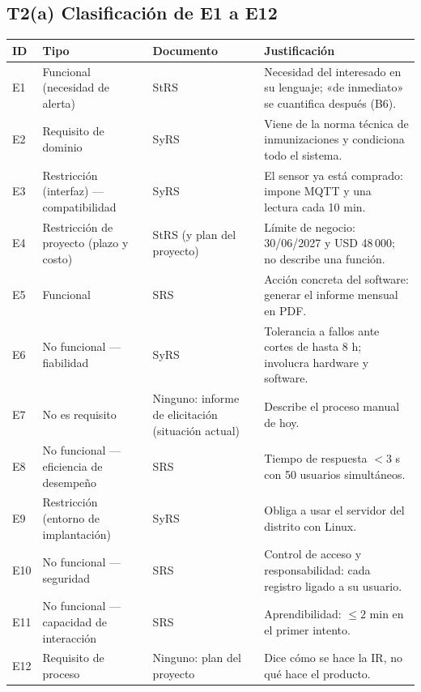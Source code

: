 \documentclass[11pt,a4paper]{article}
\begin{document}
\subsection*{T2(a) Clasificación de E1 a E12}

\begingroup
\small
\setlength{\tabcolsep}{4pt}
\renewcommand{\arraystretch}{1.2}
\begin{longtable}{@{}p{.07\linewidth}p{.27\linewidth}p{.20\linewidth}p{.39\linewidth}@{}}
\hline
\textbf{ID} & \textbf{Tipo} & \textbf{Documento} & \textbf{Justificación} \\
\hline
\endhead
E1 & Funcional (necesidad de alerta) & StRS & Necesidad del interesado en su lenguaje; «de inmediato» se cuantifica después (B6). \\
E2 & Requisito de dominio & SyRS & Viene de la norma técnica de inmunizaciones y condiciona todo el sistema. \\
E3 & Restricción (interfaz) — compatibilidad & SyRS & El sensor ya está comprado: impone MQTT y una lectura cada 10 min. \\
E4 & Restricción de proyecto (plazo y costo) & StRS (y plan del proyecto) & Límite de negocio: 30/06/2027 y USD 48\,000; no describe una función. \\
E5 & Funcional & SRS & Acción concreta del software: generar el informe mensual en PDF. \\
E6 & No funcional — fiabilidad & SyRS & Tolerancia a fallos ante cortes de hasta 8 h; involucra hardware y software. \\
E7 & No es requisito & Ninguno: informe de elicitación (situación actual) & Describe el proceso manual de hoy. \\
E8 & No funcional — eficiencia de desempeño & SRS & Tiempo de respuesta \(< 3\) s con 50 usuarios simultáneos. \\
E9 & Restricción (entorno de implantación) & SyRS & Obliga a usar el servidor del distrito con Linux. \\
E10 & No funcional — seguridad & SRS & Control de acceso y responsabilidad: cada registro ligado a su usuario. \\
E11 & No funcional — capacidad de interacción & SRS & Aprendibilidad: \(\leq 2\) min en el primer intento. \\
E12 & Requisito de proceso & Ninguno: plan del proyecto & Dice cómo se hace la IR, no qué hace el producto. \\
\hline
\end{longtable}
\endgroup

\clearpage
\appendix
\end{document}
